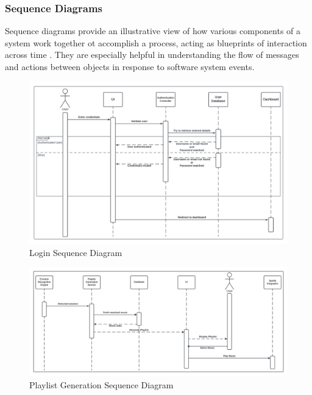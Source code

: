\subsubsection{Sequence Diagrams}
Sequence diagrams provide an illustrative view of how various components of a system work together ot accomplish a process, acting as blueprints of interaction across time \citep{bell_2004_explore}.
They are especially helpful in understanding the flow of messages and actions between objects in response to software system events.
\begin{figure}[H]
    \centering
    \includegraphics[width=16cm]{Images/login-sequence.png}
    \caption{Login Sequence Diagram}
    \label{fig:login-sequence}
\end{figure}
\begin{figure}[H]
    \centering
    \includegraphics[width=16cm]{Images/playlist-sequence.png}
    \caption{Playlist Generation Sequence Diagram}
    \label{fig:playlist-sequence}
\end{figure}
